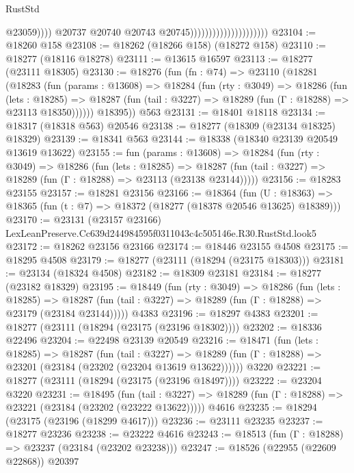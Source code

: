 \begin{lexlean}{RustStd}
\begin{coremodule}
                                                      @23059))))
                                              @20737
                                              @20740
                                              @20743
                                              @20745)))))))))))))))))))))
@23104 := @18260 @158
@23108 := @18262 (@18266 @158) (@18272 @158)
@23110 := @18277 (@18116 @18278)
@23111 := @13615 @16597
@23113 := @18277 (@23111 @18305)
@23130 := @18276
    (fun (fn : @74) =>
    @23110
      (@18281
        (@18283
          (fun (params : @13608) =>
          @18284
            (fun (rty : @3049) =>
            @18286
              (fun (lets : @18285) =>
              @18287 (fun (tail : @3227) => @18289 (fun (Γ : @18288) => @23113 @18350))))))
        @18395))
    @563
@23131 := @18401 @18118
@23134 := @18317 (@18318 @563) @20546
@23138 := @18277 (@18309 (@23134 @18325) @18329)
@23139 := @18341 @563
@23144 := @18338 (@18340 @23139 @20549 @13619 @13622)
@23155 := fun (params : @13608) =>
  @18284
    (fun (rty : @3049) =>
    @18286
      (fun (lets : @18285) =>
      @18287 (fun (tail : @3227) => @18289 (fun (Γ : @18288) => @23113 (@23138 @23144)))))
@23156 := @18283 @23155
@23157 := @18281 @23156
@23166 := @18364
    (fun (U : @18363) => @18365 (fun (t : @7) => @18372 (@18277 (@18378 @20546 @13625) @18389)))
@23170 := @23131 (@23157 @23166) LexLeanPreserve.Cc639d244984595f0311043c4c505146e.R30.RustStd.look5
@23172 := @18262 @23156 @23166
@23174 := @18446 @23155 @4508
@23175 := @18295 @4508
@23179 := @18277 (@23111 (@18294 (@23175 @18303)))
@23181 := @23134 (@18324 @4508)
@23182 := @18309 @23181
@23184 := @18277 (@23182 @18329)
@23195 := @18449
    (fun (rty : @3049) =>
    @18286
      (fun (lets : @18285) =>
      @18287 (fun (tail : @3227) => @18289 (fun (Γ : @18288) => @23179 (@23184 @23144)))))
    @4383
@23196 := @18297 @4383
@23201 := @18277 (@23111 (@18294 (@23175 (@23196 @18302))))
@23202 := @18336 @22496
@23204 := @22498 @23139 @20549
@23216 := @18471
    (fun (lets : @18285) =>
    @18287
      (fun (tail : @3227) =>
      @18289 (fun (Γ : @18288) => @23201 (@23184 (@23202 (@23204 @13619 @13622))))))
    @3220
@23221 := @18277 (@23111 (@18294 (@23175 (@23196 @18497))))
@23222 := @23204 @3220
@23231 := @18495
    (fun (tail : @3227) => @18289 (fun (Γ : @18288) => @23221 (@23184 (@23202 (@23222 @13622)))))
    @4616
@23235 := @18294 (@23175 (@23196 (@18299 @4617)))
@23236 := @23111 @23235
@23237 := @18277 @23236
@23238 := @23222 @4616
@23243 := @18513 (fun (Γ : @18288) => @23237 (@23184 (@23202 @23238)))
@23247 := @18526 (@22955 (@22609 @22868)) @20397

\end{coremodule}
\end{lexlean}

